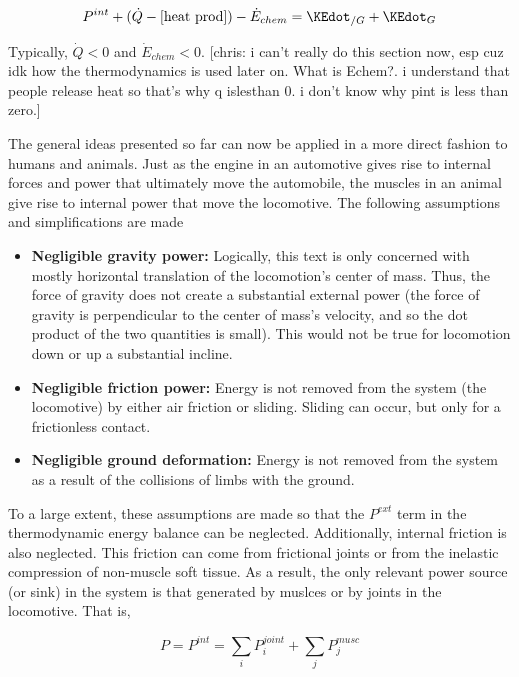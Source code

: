 \begin{equation}
P^{int} + (\dot{Q} - [\mbox{heat prod}]) - \dot{E}_{chem} = \KEdot_{/G} + \KEdot_{G}
\end{equation}

Typically, $\dot{Q} < 0$ and $\dot{E}_{chem} < 0$. [chris: i can't really do this section now, esp cuz idk how the thermodynamics is used later on. What is Echem?. i understand that people release heat so that's why q islesthan 0. i don't know why pint is less than zero.]

The general ideas presented so far can now be applied in a more direct fashion to humans and animals. Just as the engine in an automotive gives rise to internal forces and power that ultimately move the automobile, the muscles in an animal give rise to internal power that move the locomotive. The following assumptions and simplifications are made

\begin{itemize}
\item \textbf{Negligible gravity power:} Logically, this text is only concerned with mostly horizontal translation of the locomotion's center of mass. Thus, the force of gravity does not create a substantial external power (the force of gravity is perpendicular to the center of mass's velocity, and so the dot product of the two quantities is small). This would not be true for locomotion down or up a substantial incline.
\item \textbf{Negligible friction power:} Energy is not removed from the system (the locomotive) by either air friction or sliding. Sliding can occur, but only for a frictionless contact.
\item \textbf{Negligible ground deformation:} Energy is not removed from the system as a result of the collisions of limbs with the ground.
\end{itemize}

To a large extent, these assumptions are made so that the $P^{ext}$ term in the thermodynamic energy balance can be neglected. Additionally, internal friction is also neglected. This friction can come from frictional joints or from the inelastic compression of non-muscle soft tissue. As a result, the only relevant power source (or sink) in the system is that generated by muslces or by joints in the locomotive. That is,

\begin{equation}
P = P^{int} = \sum_{i} P_{i}^{joint} + \sum_{j} P_{j}^{musc}
\end{equation}

